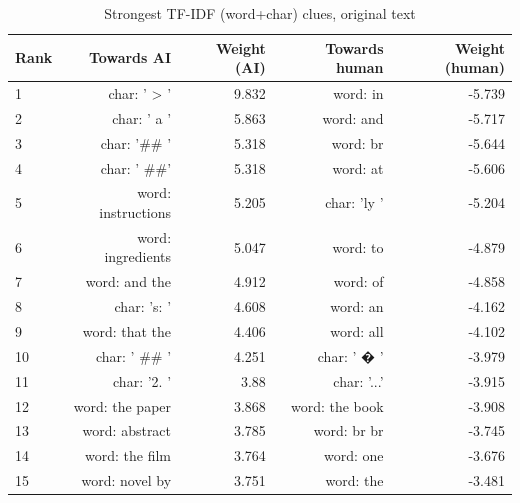 \begin{table}[!t]
\centering
\caption{Strongest TF-IDF (word+char) clues, original text}
\label{tab:tfidf_top_features}
\footnotesize
\begin{tabular}{lrrrr}
\toprule
\textbf{Rank} & \textbf{Towards AI} & \textbf{Weight (AI)} & \textbf{Towards human} & \textbf{Weight (human)} \\
\midrule
1 & char: ' > ' & 9.832 & word: in & -5.739 \\
2 & char: ' a ' & 5.863 & word: and & -5.717 \\
3 & char: '\#\# ' & 5.318 & word: br & -5.644 \\
4 & char: ' \#\#' & 5.318 & word: at & -5.606 \\
5 & word: instructions & 5.205 & char: 'ly ' & -5.204 \\
6 & word: ingredients & 5.047 & word: to & -4.879 \\
7 & word: and the & 4.912 & word: of & -4.858 \\
8 & char: 's: ' & 4.608 & word: an & -4.162 \\
9 & word: that the & 4.406 & word: all & -4.102 \\
10 & char: ' \#\# ' & 4.251 & char: ' � ' & -3.979 \\
11 & char: '2. ' & 3.88 & char: '...' & -3.915 \\
12 & word: the paper & 3.868 & word: the book & -3.908 \\
13 & word: abstract & 3.785 & word: br br & -3.745 \\
14 & word: the film & 3.764 & word: one & -3.676 \\
15 & word: novel by & 3.751 & word: the & -3.481 \\
\bottomrule
\end{tabular}
\end{table}
